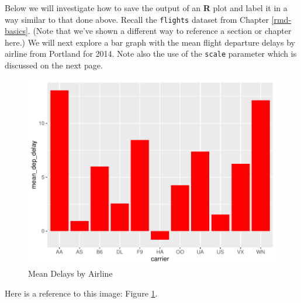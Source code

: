 \documentclass[grad,numbers]{coppe}
\newenvironment{Shaded}{\begin{snugshade}}{\end{snugshade}}
\newcommand{\DataTypeTok}[1]{\textcolor[rgb]{0.13,0.29,0.53}{#1}}
\newcommand{\KeywordTok}[1]{\textcolor[rgb]{0.13,0.29,0.53}{\textbf{#1}}}
\newcommand{\NormalTok}[1]{#1}
\newcommand{\OperatorTok}[1]{\textcolor[rgb]{0.81,0.36,0.00}{\textbf{#1}}}
\newcommand{\StringTok}[1]{\textcolor[rgb]{0.31,0.60,0.02}{#1}}
\begin{document}
  \clearpage
  
  Below we will investigate how to save the output of an \textbf{R} plot and label it in a way similar to that done above. Recall the \texttt{flights} dataset from Chapter \ref{rmd-basics}. (Note that we've shown a different way to reference a section or chapter here.) We will next explore a bar graph with the mean flight departure delays by airline from Portland for 2014. Note also the use of the \texttt{scale} parameter which is discussed on the next page.
  \begin{Shaded}
  \end{Shaded}
  \begin{figure}
  \centering
  \includegraphics{thesis_files/figure-latex/delaysboxplot-1.pdf}
  \caption{\label{fig:delaysboxplot}Mean Delays by Airline}
  \end{figure}
  Here is a reference to this image: Figure \ref{fig:delaysboxplot}.
  
\end{document}
